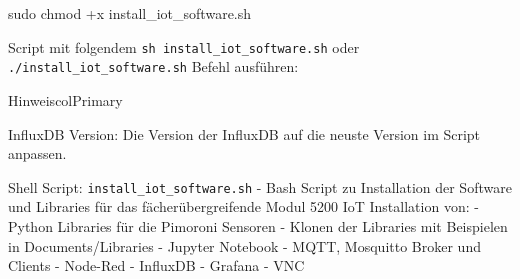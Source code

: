 \documentclass[
  11pt,
  a4paper,
  oneside, openany  ,captions=tableheading
]{scrbook}
\newenvironment{Shaded}{\begin{snugshade}}{\end{snugshade}}
\newcommand{\FunctionTok}[1]{\textcolor[rgb]{0.28,0.35,0.67}{#1}}
\newcommand{\NormalTok}[1]{\textcolor[rgb]{0.00,0.23,0.31}{#1}}
\theoremstyle{remark}
\begin{document}
\begin{Shaded}
\begin{Highlighting}[]
\FunctionTok{sudo}\NormalTok{ chmod +x install\_iot\_software.sh}
\end{Highlighting}
\end{Shaded}

Script mit folgendem \texttt{sh\ install\_iot\_software.sh} oder
\texttt{./install\_iot\_software.sh} Befehl ausführen:

\begin{boxtitle}{Hinweis}{colPrimary}

InfluxDB Version: Die Version der InfluxDB auf die neuste Version im
Script anpassen.

\end{boxtitle}

Shell Script: \texttt{install\_iot\_software.sh} - Bash Script zu
Installation der Software und Libraries für das fächerübergreifende
Modul 5200 IoT Installation von: - Python Libraries für die Pimoroni
Sensoren - Klonen der Libraries mit Beispielen in Documents/Libraries -
Jupyter Notebook - MQTT, Mosquitto Broker und Clients - Node-Red -
InfluxDB - Grafana - VNC
\end{document}
